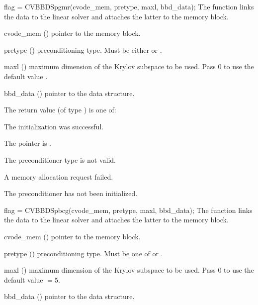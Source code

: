 {
  flag = CVBBDSpgmr(cvode\_mem, pretype, maxl, bbd\_data);
}
{
  The function  links the {\cvbbdpre} data to the
  {\cvspgmr} linear solver and attaches the latter to the {\cvodes}
  memory block.
}
{
  \begin{args}
  \item[cvode\_mem] ()
    pointer to the {\cvodes} memory block.
  \item[pretype] ()
    preconditioning type. Must be either  or .
  \item[maxl] ()
    maximum dimension of the Krylov subspace to be used. Pass $0$ to use the 
    default value .
  \item[bbd\_data] ()
    pointer to the {\cvbbdpre} data structure.
  \end{args}
}
{
  The return value  (of type ) is one of:
  \begin{args}
  \item[\Id{CVSPGMR\_SUCCESS}] 
    The {\cvspgmr} initialization was successful.
  \item[\Id{CVSPGMR\_MEM\_NULL}]
    The  pointer is .
  \item[\Id{CVSPGMR\_ILL\_INPUT}]
    The preconditioner type  is not valid.
  \item[\Id{CVSPGMR\_MEM\_FAIL}]
    A memory allocation request failed.
  \item[\Id{CVBBDPRE\_PDATA\_NULL}]
    The {\cvbbdpre} preconditioner has not been initialized.
  \end{args}
}
{}
{
  flag = CVBBDSpbcg(cvode\_mem, pretype, maxl, bbd\_data);
}
{
  The function  links the {\cvbbdpre} data to the
  {\cvspbcg} linear solver and attaches the latter to the {\cvodes}
  memory block.
}
{
  \begin{args}
  \item[cvode\_mem] ()
    pointer to the {\cvodes} memory block.
  \item[pretype] ()
    preconditioning type. Must be one of  or .
  \item[maxl] ()
    maximum dimension of the Krylov subspace to be used. Pass $0$ to use the 
    default value  $= 5$.
  \item[bbd\_data] ()
    pointer to the {\cvbbdpre} data structure.
  \end{args}
}
